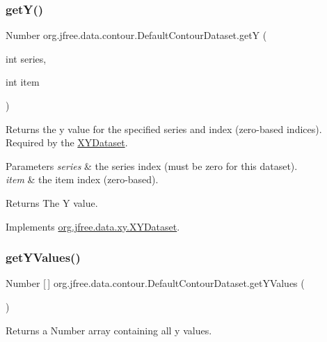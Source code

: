 \subsubsection{\texorpdfstring{get\+Y()}{getY()}}
{\footnotesize\ttfamily Number org.\+jfree.\+data.\+contour.\+Default\+Contour\+Dataset.\+getY (\begin{DoxyParamCaption}\item[{int}]{series,  }\item[{int}]{item }\end{DoxyParamCaption})}

Returns the y value for the specified series and index (zero-\/based indices). Required by the \mbox{\hyperlink{}{X\+Y\+Dataset}}.


\begin{DoxyParams}{Parameters}
{\em series} & the series index (must be zero for this dataset). \\
\hline
{\em item} & the item index (zero-\/based).\\
\hline
\end{DoxyParams}
\begin{DoxyReturn}{Returns}
The Y value. 
\end{DoxyReturn}


Implements \mbox{\hyperlink{interfaceorg_1_1jfree_1_1data_1_1xy_1_1_x_y_dataset_aa915867221e0f94021bad3140db5254e}{org.\+jfree.\+data.\+xy.\+X\+Y\+Dataset}}.

\mbox{\label{classorg_1_1jfree_1_1data_1_1contour_1_1_default_contour_dataset_a0f3d5f992c8fdb948d8d07d5d4058ef9}} 
\subsubsection{\texorpdfstring{get\+Y\+Values()}{getYValues()}}
{\footnotesize\ttfamily Number \mbox{[}$\,$\mbox{]} org.\+jfree.\+data.\+contour.\+Default\+Contour\+Dataset.\+get\+Y\+Values (\begin{DoxyParamCaption}{ }\end{DoxyParamCaption})}

Returns a Number array containing all y values.

